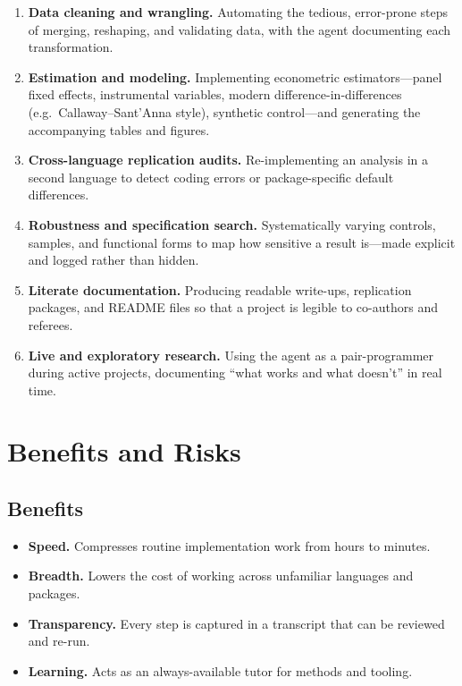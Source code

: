 \documentclass[11pt]{article}
\begin{document}
\begin{enumerate}[leftmargin=1.5em]
  \item \textbf{Data cleaning and wrangling.} Automating the tedious,
        error-prone steps of merging, reshaping, and validating data, with
        the agent documenting each transformation.
  \item \textbf{Estimation and modeling.} Implementing econometric
        estimators---panel fixed effects, instrumental variables, modern
        difference-in-differences (e.g.\ Callaway--Sant'Anna style),
        synthetic control---and generating the accompanying tables and
        figures.
  \item \textbf{Cross-language replication audits.} Re-implementing an
        analysis in a second language to detect coding errors or
        package-specific default differences.
  \item \textbf{Robustness and specification search.} Systematically
        varying controls, samples, and functional forms to map how
        sensitive a result is---made explicit and logged rather than
        hidden.
  \item \textbf{Literate documentation.} Producing readable write-ups,
        replication packages, and README files so that a project is
        legible to co-authors and referees.
  \item \textbf{Live and exploratory research.} Using the agent as a
        pair-programmer during active projects, documenting ``what works
        and what doesn't'' in real time.
\end{enumerate}

\section{Benefits and Risks}

\subsection{Benefits}
\begin{itemize}[leftmargin=1.4em]
  \item \textbf{Speed.} Compresses routine implementation work from hours to
        minutes.
  \item \textbf{Breadth.} Lowers the cost of working across unfamiliar
        languages and packages.
  \item \textbf{Transparency.} Every step is captured in a transcript that
        can be reviewed and re-run.
  \item \textbf{Learning.} Acts as an always-available tutor for methods and
        tooling.
\end{itemize}
\end{document}
